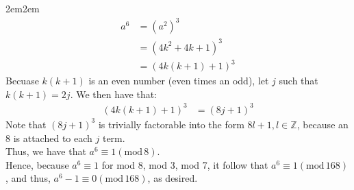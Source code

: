 \documentclass[10pt,oneside]{book}
\newcommand{\Z}{\mathbb{Z}}\newcommand{\R}{\mathbb{R}}\newcommand{\N}{\mathbb{N}}
\newcommand{\gspc}{\vspace{0.13cm}} %
\newcommand{\gline}{\gspc\\} %
\newcommand{\gmod}{\text{mod}\,}
\let\endoldproof\endproof
\renewenvironment{proof}[1][\proofname]
  {\vspace{0.2cm}\begin{adjustwidth}{2em}{2em}
   \oldproof[#1]}
  {\endoldproof
\end{adjustwidth}}
\begin{document}
\begin{enumerate}
\begin{enumerate}
\begin{proof}
			\begin{align*}
				a^6 &= (a^2)^3\\
				&= (4k^2 + 4k + 1)^3\\
				&= (4k(k+1) + 1)^3
			\end{align*}
			Becuase $k(k+1)$ is an even number (even times an odd), let $j$ such that $k(k+1) = 2j$. We then have that:
			\begin{align*}
				(4k(k+1)+1)^3 &= (8j + 1)^3
			\end{align*}
			Note that $(8j+1)^3$ is trivially factorable into the form $8l + 1, l\in\Z$, because an 8 is attached to each $j$ term. 
			\gline 
			Thus, we have that $a^6 \equiv 1 (\gmod 8)$. \gline
			Hence, because $a^6\equiv 1$ for mod 8, mod 3, mod 7, it follow that $a^6\equiv 1(\gmod 168)$, and thus, $a^6 - 1 \equiv 0 (\gmod 168)$, as desired. 
		\end{proof}


\end{enumerate}
\end{enumerate}
\end{document}
